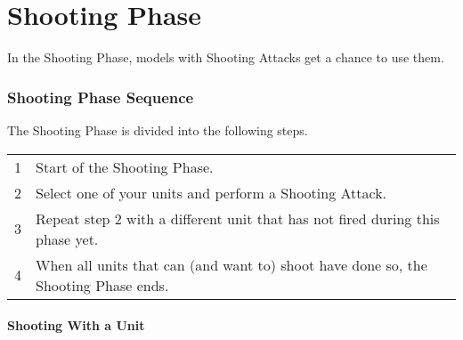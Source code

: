 \part{Shooting Phase}
\label{shooting_phase}

In the Shooting Phase, models with Shooting Attacks get a chance to use them.

\section{Shooting Phase Sequence}
\label{shooting_phase_sequence}

The Shooting Phase is divided into the following steps.

\hspace*{0.3cm}
\begin{tabular}{c | m{14cm}}
1 & Start of the Shooting Phase.\\
2 & Select one of your units and perform a Shooting Attack.\\
3 & Repeat step 2 with a different unit that has not fired during this phase yet.\\
4 & When all units that can (and want to) shoot have done so, the Shooting Phase ends.\\
\end{tabular}

\subsection{Shooting With a Unit}
\label{shooting_with_a_unit}

